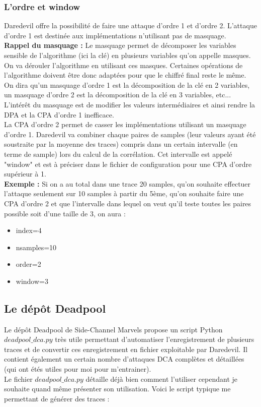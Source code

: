 \documentclass[10pt,a4paper]{article}
\begin{document}
\subsubsection{L'ordre et window}
Daredevil offre la possibilité de faire une attaque d'ordre 1 et d'ordre 2. L'attaque d'ordre 1 est destinée aux implémentations n'utilisant pas de masquage.\\
\textbf{Rappel du masquage : }Le masquage permet de décomposer les variables sensible de l'algorithme (ici la clé) en plusieurs variables qu'on appelle masques. On va dérouler l'algorithme en utilisant ces masques. Certaines opérations de l'algorithme doivent être donc adaptées pour que le chiffré final reste le même. On dira qu'un masquage d'ordre 1 est la décomposition de la clé en 2 variables, un masquage d'ordre 2 est la décomposition de la clé en 3 variables, etc... L'intérêt du masquage est de modifier les valeurs intermédiaires et ainsi rendre la DPA et la CPA d'ordre 1 inefficace.\\
La CPA d'ordre 2 permet de casser les implémentations utilisant un masquage d'ordre 1. Daredevil va combiner chaque paires de samples (leur valeurs ayant été soustraite par la moyenne des traces) compris dans un certain intervalle (en terme de sample) lors du calcul de la corrélation. Cet intervalle est appelé "window" et est à préciser dans le fichier de configuration pour une CPA d'ordre supérieur à 1.\\
\textbf{Exemple : }Si on a au total dans une trace 20 samples, qu'on souhaite effectuer l'attaque seulement sur 10 samples à partir du 5ème, qu'on souhaite faire une CPA d'ordre 2 et que l'intervalle dans lequel on veut qu'il teste toutes les paires possible soit d'une taille de 3, on aura :
\begin{itemize}
\item index=4
\item nsamples=10
\item order=2
\item window=3
\end{itemize}


\subsection{Le dépôt Deadpool}
Le dépôt Deadpool de Side-Channel Marvels propose un script Python $deadpool\_dca.py$ très utile permettant d'automatiser l'enregistrement de plusieurs traces et de convertir ces enregistrement en fichier exploitable par Daredevil. Il contient également un certain nombre d'attaques DCA complètes et détaillées (qui ont étés utiles pour moi pour m'entrainer).\\
Le fichier $deadpool\_dca.py$ détaille déjà bien comment l'utiliser cependant je souhaite quand même présenter son utilisation. Voici le script typique me permettant de générer des traces :\\
\end{document}
